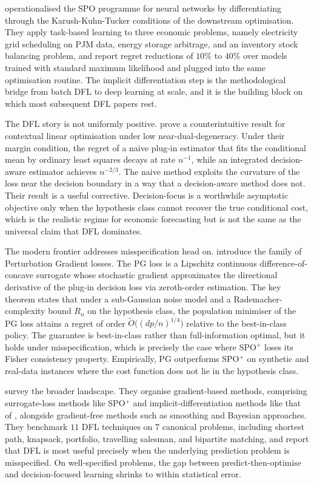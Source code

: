 \citet{DontiAmosKolter2017} operationalised the SPO programme for neural networks by
differentiating through the Karush-Kuhn-Tucker conditions of the downstream
optimisation. They apply task-based learning to three economic problems, namely
electricity grid scheduling on PJM data, energy storage arbitrage, and an inventory
stock balancing problem, and report regret reductions of $10\%$ to $40\%$ over models
trained with standard maximum likelihood and plugged into the same optimisation
routine. The implicit differentiation step is the methodological bridge from
batch DFL to deep learning at scale, and it is the building block on which most
subsequent DFL papers rest.

The DFL story is not uniformly positive. \citet{HuKallus2020} prove a counterintuitive
result for contextual linear optimisation under low near-dual-degeneracy. Under their
margin condition, the regret of a naive plug-in estimator that fits the conditional
mean by ordinary least squares decays at rate $n^{-1}$, while an integrated decision-aware
estimator achieves $n^{-2/3}$. The naive method exploits the curvature of the loss
near the decision boundary in a way that a decision-aware method does not. Their
result is a useful corrective. Decision-focus is a worthwhile asymptotic objective
only when the hypothesis class cannot recover the true conditional cost, which is
the realistic regime for economic forecasting but is not the same as the universal
claim that DFL dominates.

The modern frontier addresses misspecification head on. \citet{HuangGupta2024}
introduce the family of Perturbation Gradient losses. The PG loss is a Lipschitz
continuous difference-of-concave surrogate whose stochastic gradient approximates
the directional derivative of the plug-in decision loss via zeroth-order
estimation. The key theorem states that under a sub-Gaussian noise model and a
Rademacher-complexity bound $R_n$ on the hypothesis class, the population
minimiser of the PG loss attains a regret of order
$\widetilde O\bigl((dp/n)^{1/4}\bigr)$ relative to the best-in-class policy. The
guarantee is best-in-class rather than full-information optimal, but it holds under
misspecification, which is precisely the case where SPO$^+$ loses its Fisher
consistency property. Empirically, PG outperforms SPO$^+$ on synthetic and
real-data instances where the cost function does not lie in the hypothesis class.

\citet{Mandi2024} survey the broader landscape. They organise gradient-based
methods, comprising surrogate-loss methods like SPO$^+$ and implicit-differentiation
methods like that of \citet{DontiAmosKolter2017}, alongside gradient-free methods such
as smoothing and Bayesian approaches. They benchmark $11$ DFL techniques on $7$
canonical problems, including shortest path, knapsack, portfolio, travelling
salesman, and bipartite matching, and report that DFL is most useful precisely when
the underlying prediction problem is misspecified. On well-specified problems,
the gap between predict-then-optimise and decision-focused learning shrinks to
within statistical error.
